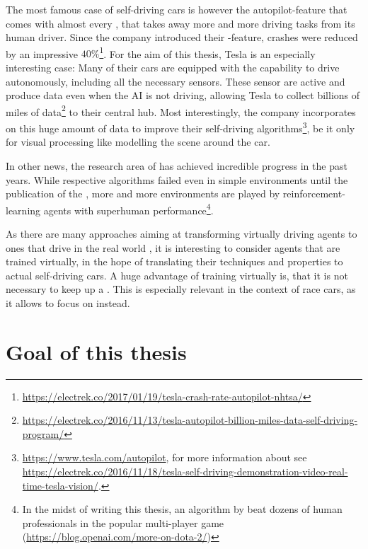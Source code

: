 The most famous case of self-driving cars is however the autopilot-feature that comes with almost every , that takes away more and more driving tasks from its human driver. Since the company introduced their -feature, crashes were reduced by an impressive $40\%$\footnote{\url{https://electrek.co/2017/01/19/tesla-crash-rate-autopilot-nhtsa/}}. For the aim of this thesis, Tesla is an especially interesting case: Many of their cars are equipped with the capability to drive autonomously, including all the necessary sensors. These sensor are active and produce data even when the AI is not driving, allowing Tesla to collect billions of miles of data\footnote{\url{https://electrek.co/2016/11/13/tesla-autopilot-billion-miles-data-self-driving-program/}} to their central hub. Most interestingly, the company incorporates  on this huge amount of data to improve their self-driving algorithms\footnote{\url{https://www.tesla.com/autopilot}, for more information about  see  \url{https://electrek.co/2016/11/18/tesla-self-driving-demonstration-video-real-time-tesla-vision/}.}, be it only for visual processing like modelling the scene around the car.

In other news, the research area of  has achieved incredible progress in the past years. While respective algorithms failed even in simple environments until the publication of the \cite{mnih_playing_2013}, more and more environments are played by reinforcement-learning agents with superhuman performance\footnote{In the midst of writing this thesis, an algorithm by  beat dozens of human professionals in the popular multi-player game  (\url{https://blog.openai.com/more-on-dota-2/})}. 

As there are many approaches aiming at transforming virtually driving agents to ones that drive in the real world \cite{you_virtual_2017}, it is interesting to consider agents that are trained virtually, in the hope of translating their techniques and properties to actual self-driving cars. A huge advantage of training virtually is, that it is not necessary to keep up a . This is especially relevant in the context of race cars, as it allows to focus on  instead.

\section{Goal of this thesis}

